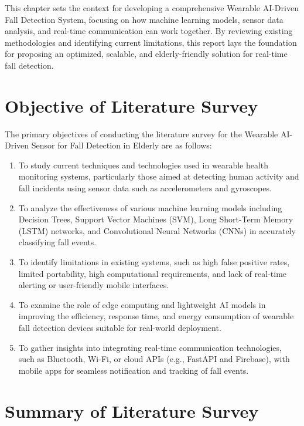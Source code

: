 \documentclass[a4paper, 12pt]{report}
\begin{document}
This chapter sets the context for developing a comprehensive Wearable AI-Driven Fall Detection System, focusing on how machine learning models, sensor data analysis, and real-time communication can work together. By reviewing existing methodologies and identifying current limitations, this report lays the foundation for proposing an optimized, scalable, and elderly-friendly solution for real-time fall detection.

\section{Objective of Literature Survey}
The primary objectives of conducting the literature survey for the Wearable AI-Driven Sensor for Fall Detection in Elderly are as follows:
\begin{enumerate}[itemsep=-4pt, label=\roman*.]
    \item To study current techniques and technologies used in wearable health monitoring systems, particularly those aimed at detecting human activity and fall incidents using sensor data such as accelerometers and gyroscopes.
    \item  To analyze the effectiveness of various machine learning models including Decision Trees, Support Vector Machines (SVM), Long Short-Term Memory (LSTM) networks, and Convolutional Neural Networks (CNNs) in accurately classifying fall events.
    \item To identify limitations in existing systems, such as high false positive rates, limited portability, high computational requirements, and lack of real-time alerting or user-friendly mobile interfaces.
    \item To examine the role of edge computing and lightweight AI models in improving the efficiency, response time, and energy consumption of wearable fall detection devices suitable for real-world deployment.
    \item To gather insights into integrating real-time communication technologies, such as Bluetooth, Wi-Fi, or cloud APIs (e.g., FastAPI and Firebase), with mobile apps for seamless notification and tracking of fall events.
\end{enumerate}

\section{Summary of Literature Survey}
\end{document}
